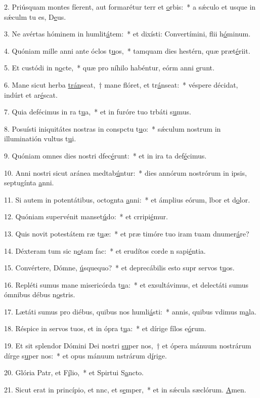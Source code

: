 2. Priúsquam montes fíerent, aut formarétur terr et \uline{o}rbis:~* a sǽculo et usque in sǽculm tu es, D\uline{e}us.\par 
3. Ne avértas hóminem in humlit\uline{á}tem:~* et dixísti: Convertímini, flii h\uline{ó}minum.\par 
4. Quóniam mille anni ante óclos t\uline{u}os,~* tamquam dies hestérn, quæ præt\uline{é}riit.\par 
5. Et custódi in n\uline{o}cte,~* quæ pro níhilo habéntur, eórm anni \uline{e}runt.\par 
6. Mane sicut herba \uline{trán}seat,~† mane flóret, et tr\uline{á}nseat:~* véspere décidat, indúrt et ar\uline{é}scat.\par 
7. Quia defécimus in ra t\uline{u}a,~* et in furóre tuo trbáti s\uline{u}mus.\par 
8. Posuísti iniquitátes nostras in conspctu t\uline{u}o:~* sǽculum nostrum in illuminatión vultus t\uline{u}i.\par 
9. Quóniam omnes dies nostri dfec\uline{é}runt:~* et in ira ta def\uline{é}cimus.\par 
10. Anni nostri sicut aránea medtab\uline{ú}ntur:~* dies annórum nostrórum in ipsis, septugínta \uline{a}nni.\par 
11. Si autem in potentátibus, octognta \uline{a}nni:~* et ámplius eórum, lbor et d\uline{o}lor.\par 
12. Quóniam supervénit manset\uline{ú}do:~* et crripi\uline{é}mur.\par 
13. Quis novit potestátem ræ t\uline{u}æ:~* et præ timóre tuo iram tuam dnumer\uline{á}re?\par 
14. Déxteram tum sic n\uline{o}tam fac:~* et erudítos corde n sapi\uline{é}ntia.\par 
15. Convértere, Dómne, \uline{ú}squequo?~* et deprecábilis esto supr servos t\uline{u}os.\par 
16. Repléti sumus mane misericórda t\uline{u}a:~* et exsultávimus, et delectáti sumus ómnibus débus n\uline{o}stris.\par 
17. Lætáti sumus pro diébus, quibus nos humli\uline{á}sti:~* annis, quibus vdimus m\uline{a}la.\par 
18. Réspice in servos tuos, et in ópra t\uline{u}a:~* et dírige fílos e\uline{ó}rum.\par 
19. Et sit splendor Dómini Dei nostri \uline{su}per nos,~† et ópera mánuum nostrárum dírge s\uline{u}per nos:~* et opus mánuum nstrárum d\uline{í}rige.\par 
20. Glória Patr, et F\uline{í}lio,~* et Spirtui S\uline{a}ncto.\par 
21. Sicut erat in princípio, et nnc, et s\uline{e}mper,~* et in sǽcula sæclórum. \uline{A}men.\par 
